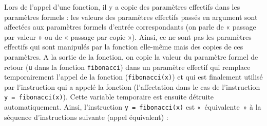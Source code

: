 Lors de l'appel d'une fonction, il y a copie des paramètres effectifs 
dans les paramètres formels : les valeurs des paramètres effectifs 
passés en argument sont affectées aux paramètres formels d'entrée 
correspondants (on parle de « passage par valeur » ou de « passage par copie »). 
Ainsi, ce ne sont pas les paramètres effectifs qui sont manipulés par la 
fonction elle-même mais des copies de ces paramètres. 
A la sortie de la fonction, on copie la valeur du paramètre 
formel de retour ({\tt u} dans la fonction {\tt fibonacci}) dans un paramètre 
effectif qui remplace temporairement l'appel de la fonction ({\tt fibonacci(x)})
et qui est finalement utilisé par l'instruction qui a appelé la fonction
(l'affectation dans le cas de l'instruction {\tt y = fibonacci(x)}).
Cette variable temporaire est ensuite détruite automatiquement.
Ainsi, l'instruction {\tt y = fibonacci(x)} est «~équivalente~» à la séquence 
d'instructions suivante (appel équivalent) :

